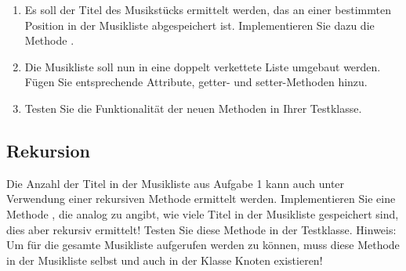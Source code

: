 \documentclass{lehramt-informatik-aufgabe}
\begin{document}
\begin{enumerate}
%

\item Es soll der Titel des Musikstücks ermittelt werden, das an einer
bestimmten Position in der Musikliste abgespeichert ist. Implementieren
Sie dazu die Methode .

\begin{antwort}
\end{antwort}

%

\item Die Musikliste soll nun in eine doppelt verkettete Liste umgebaut
werden. Fügen Sie entsprechende Attribute, getter- und setter-Methoden
hinzu.

\begin{antwort}
\end{antwort}

%

\item Testen Sie die Funktionalität der neuen Methoden in Ihrer
Testklasse.

\begin{antwort}
\end{antwort}

\end{enumerate}

\subsection{Rekursion}

Die Anzahl der Titel in der Musikliste aus Aufgabe 1 kann auch unter
Verwendung einer rekursiven Methode ermittelt werden. Implementieren Sie
eine Methode , die analog zu
 angibt, wie viele Titel in der Musikliste
gespeichert sind, dies aber rekursiv ermittelt! Testen Sie diese Methode
in der Testklasse. Hinweis: Um für die gesamte Musikliste aufgerufen
werden zu können, muss diese Methode in der Musikliste selbst und auch
in der Klasse Knoten existieren!

\begin{antwort}


\end{antwort}
\end{document}
